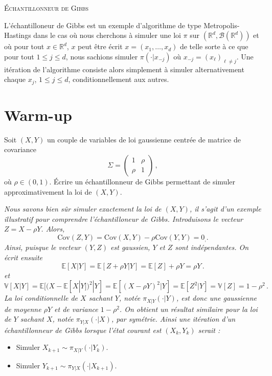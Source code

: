 \documentclass[a4paper,10pt,fleqn]{article}
\newcommand{\rset}{\ensuremath{\mathbb{R}}}
\newcommand{\1}{\ensuremath{\mathbbm{1}}}
\begin{document}

\noindent\hrulefill

\begin{center}
\textsc{\'Echantillonneur de Gibbs}
\end{center}
\hrulefill

\medskip


L'\'echantilloneur de Gibbs est un exemple d'algorithme de type Metropolis-Hastings dans le cas o\`u nous cherchons \`a simuler une loi  $\pi$ sur $(\rset^d,\mathcal{B}(\rset^d))$ et o\`u pour tout $x\in\rset^d$, $x$ peut \^etre \'ecrit $x = (x_{1},\ldots,x_{d})$ de telle sorte \`a ce que pour tout  $1\leq j \leq d$,  nous sachions simuler $\pi(\cdot |x_{-j})$ o\`u $x_{{-j}} = (x_{\ell})_{\ell \neq j}$. Une it\'eration de l'algorithme consiste alors simplement \`a simuler alternativement chaque $x_{j}$, $1\leq j \leq d$, conditionnellement aux autres.

\section*{Warm-up}
Soit $(X,Y)$ un couple de variables de loi gaussienne centr\'ee de matrice de covariance 
$$
\Sigma = \begin{pmatrix}
1 & \rho\\ \rho & 1
\end{pmatrix}\,,
$$
o\`u $\rho \in(0,1)$. 
\'Ecrire un \'echantillonneur de Gibbs permettant de simuler approximativement la loi de $(X,Y)$.

\vspace{.2cm}

{\em
Nous savons bien s\^ur simuler exactement la loi de $(X,Y)$, il s'agit d'un exemple illustratif pour comprendre l'\'echantilloneur de Gibbs. Introduisons le vecteur $Z = X-\rho Y$. Alors, 
$$
\mathrm{Cov}(Z,Y) = \mathrm{Cov}(X,Y) - \rho\mathrm{Cov}(Y,Y) = 0_,.
$$
Ainsi, puisque le vecteur $(Y,Z)$ est gaussien, $Y$ et $Z$ sont ind\'ependantes. On \'ecrit ensuite 
$$
\mathbb{E}[X|Y] = \mathbb{E}[Z+\rho Y|Y] = \mathbb{E}[Z] +\rho Y = \rho Y\,.
$$
et
$$
\mathbb{V}[X|Y] = \mathbb{E}[(X- \mathbb{E}[X|Y])^2|Y] =\mathbb{E}[(X- \rho Y)^2|Y] = \mathbb{E}[Z^2|Y] = \mathbb{V}[Z] = 1-\rho^2\,.
$$
La loi conditionnelle de $X$ sachant $Y$, not\'ee $\pi_{X|Y}(\cdot |Y)$, est donc une gaussienne de moyenne $\rho Y$ et de variance $1-\rho^2$. On obtient un r\'esultat similaire pour la loi de $Y$ sachant $X$, not\'ee $\pi_{Y|X}(\cdot |X)$, par sym\'etrie. Ainsi une it\'eration d'un \'echantillonneur de Gibbs  lorsque l'\'etat courant est $(X_k,Y_k)$ serait :
\begin{itemize}
\item Simuler $X_{k+1} \sim \pi_{X|Y}(\cdot |Y_k)$.
\item Simuler $Y_{k+1} \sim \pi_{Y|X}(\cdot |X_{k+1})$.
\end{itemize}
}
\end{document}
